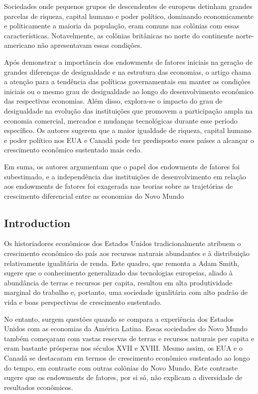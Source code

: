 \documentclass[a4paper,12pt]{article}[abntex2]
\begin{document}
Sociedades onde pequenos grupos de descendentes de europeus detinham grandes parcelas de riqueza, capital humano e poder político, dominando economicamente e politicamente a maioria da população, eram comuns nas colônias com essas características. Notavelmente, as colônias britânicas no norte do continente norte-americano não apresentavam essas condições.

Após demonstrar a importância dos endowments de fatores iniciais na geração de grandes diferenças de desigualdade e na estrutura das economias, o artigo chama a atenção para a tendência das políticas governamentais em manter as condições iniciais ou o mesmo grau de desigualdade ao longo do desenvolvimento econômico das respectivas economias. Além disso, explora-se o impacto do grau de desigualdade na evolução das instituições que promovem a participação ampla na economia comercial, mercados e mudanças tecnológicas durante esse período específico. Os autores sugerem que a maior igualdade de riqueza, capital humano e poder político nos EUA e Canadá pode ter predisposto esses países a alcançar o crescimento econômico sustentado mais cedo.

Em suma, os autores argumentam que o papel dos endowments de fatores foi subestimado, e a independência das instituições de desenvolvimento em relação aos endowments de fatores foi exagerada nas teorias sobre as trajetórias de crescimento diferencial entre as economias do Novo Mundo

\subsection*{\textbf{Introduction}}

Os historiadores econômicos dos Estados Unidos tradicionalmente atribuem o crescimento econômico do país aos recursos naturais abundantes e à distribuição relativamente igualitária de renda. Este quadro, que remonta a Adam Smith, sugere que o conhecimento generalizado das tecnologias europeias, aliado à abundância de terras e recursos per capita, resultou em alta produtividade marginal do trabalho e, portanto, uma sociedade igualitária com alto padrão de vida e boas perspectivas de crescimento sustentado.

No entanto, surgem questões quando se compara a experiência dos Estados Unidos com as economias da América Latina. Essas sociedades do Novo Mundo também começaram com vastas reservas de terras e recursos naturais per capita e eram bastante prósperas nos séculos XVII e XVIII. Mesmo assim, os EUA e o Canadá se destacaram em termos de crescimento econômico sustentado ao longo do tempo, em contraste com outras colônias do Novo Mundo. Este contraste sugere que os endowments de fatores, por si só, não explicam a diversidade de resultados econômicos.
\end{document}
